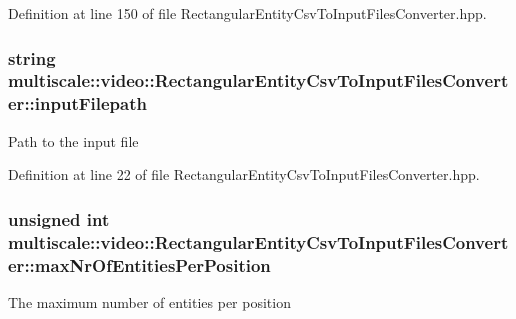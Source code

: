 Definition at line 150 of file Rectangular\-Entity\-Csv\-To\-Input\-Files\-Converter.\-hpp.

\hypertarget{classmultiscale_1_1video_1_1RectangularEntityCsvToInputFilesConverter_adde5ccc0bde141f73917eba8029fe1f6}{
\subsubsection[{input\-Filepath}]{\setlength{\rightskip}{0pt plus 5cm}string multiscale\-::video\-::\-Rectangular\-Entity\-Csv\-To\-Input\-Files\-Converter\-::input\-Filepath\hspace{0.3cm}{\ttfamily [private]}}}\label{classmultiscale_1_1video_1_1RectangularEntityCsvToInputFilesConverter_adde5ccc0bde141f73917eba8029fe1f6}
Path to the input file 

Definition at line 22 of file Rectangular\-Entity\-Csv\-To\-Input\-Files\-Converter.\-hpp.

\hypertarget{classmultiscale_1_1video_1_1RectangularEntityCsvToInputFilesConverter_adcea224ee3e6f8fbecca3754774afbac}{
\subsubsection[{max\-Nr\-Of\-Entities\-Per\-Position}]{\setlength{\rightskip}{0pt plus 5cm}unsigned int multiscale\-::video\-::\-Rectangular\-Entity\-Csv\-To\-Input\-Files\-Converter\-::max\-Nr\-Of\-Entities\-Per\-Position\hspace{0.3cm}{\ttfamily [private]}}}\label{classmultiscale_1_1video_1_1RectangularEntityCsvToInputFilesConverter_adcea224ee3e6f8fbecca3754774afbac}
The maximum number of entities per position 

